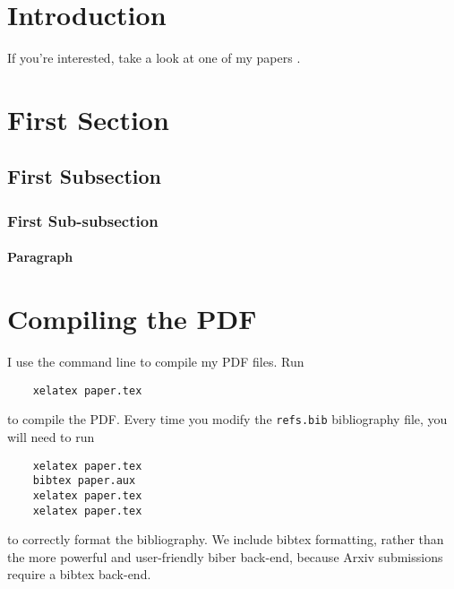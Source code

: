 


%
%

\section{Introduction}

If you're interested, take a look at one of my papers \cite{sahu-mandadapu-pre-2020}.
\lipsum[2]



%
%

\section{First Section} \label{sec:first_section}

\lipsum[3]



%
%

\subsection{First Subsection}

\lipsum[4]



%
%

\subsubsection{First Sub-subsection}

\lipsum[5]



%
%

\paragraph{Paragraph}

\lipsum[6]



%
%

\section{Compiling the PDF}

I use the command line to compile my PDF files.
Run
\begin{verbatim}
	xelatex paper.tex
\end{verbatim}
to compile the PDF.
Every time you modify the \verb+refs.bib+ bibliography file, you will need to run
\begin{verbatim}
	xelatex paper.tex
	bibtex paper.aux
	xelatex paper.tex
	xelatex paper.tex
\end{verbatim}
to correctly format the bibliography.
We include bibtex formatting, rather than the more powerful and user-friendly biber back-end, because Arxiv submissions require a bibtex back-end.



